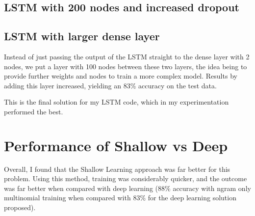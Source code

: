 \documentclass[12pt]{article}
\begin{document}
\subsection{LSTM with 200 nodes and increased dropout}

\subsection{LSTM with larger dense layer}
Instead of just passing the output of the LSTM straight to the dense layer with 2 nodes, we put a layer with 100 nodes between these two layers,
the idea being to provide further weights and nodes to train a more complex model. Results by adding this layer increased, yielding an 83\% accuracy on the test data.

This is the final solution for my LSTM code, which in my experimentation performed the best.

\section{Performance of Shallow vs Deep}
Overall, I found that the Shallow Learning approach was far better for this problem. Using this method, training was considerably quicker, and the outcome was far better when
compared with deep learning (88\% accuracy with ngram only multinomial training when compared with 83\% for the deep learning solution proposed).
\end{document}

